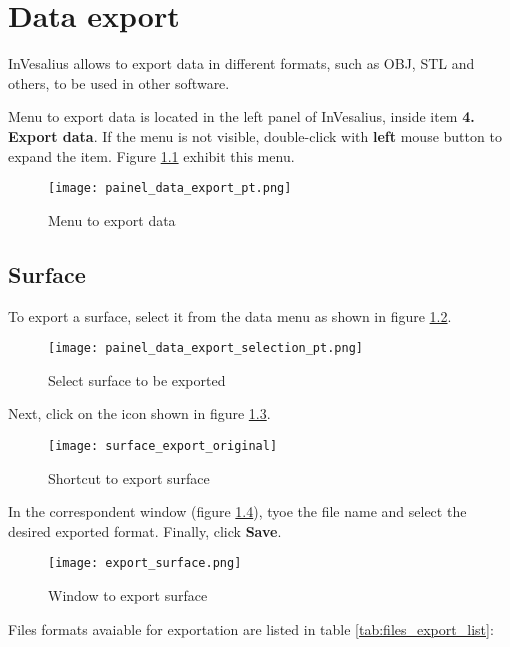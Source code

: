 \chapter{Data export}

InVesalius allows to export data in different formats, such as OBJ, STL and others, to be used in other software.

Menu to export data is located in the left panel of InVesalius,
inside item \textbf{4. Export data}. If the menu is not visible, double-click with \textbf{left} mouse button
to expand the item. Figure \ref{fig:data_export} exhibit this menu.

\begin{figure}[!htb]
\centering
\texttt{[image: painel\_data\_export\_pt.png]}
\caption{Menu to export data}
\label{fig:data_export}
\end{figure}

\section{Surface}

To export a surface, select it from the data menu as shown in
figure \ref{fig:data_export_selection}.

\newpage

\begin{figure}[!htb]
\centering
\texttt{[image: painel\_data\_export\_selection\_pt.png]}
\caption{Select surface to be exported}
\label{fig:data_export_selection}
\end{figure}

Next, click on the icon shown in figure \ref{fig:surface_export_original}.

\begin{figure}[!htb]
\centering
\texttt{[image: surface\_export\_original]}
\caption{Shortcut to export surface}
\label{fig:surface_export_original}
\end{figure}

In the correspondent window (figure \ref{fig:export_data_window}), tyoe the file name and
select the desired exported format. Finally, click \textbf{Save}.


\begin{figure}[!htb]
\centering
\texttt{[image: export\_surface.png]}
\caption{Window to export surface}
\label{fig:export_data_window}
\end{figure}

Files formats avaiable for exportation are listed in table
\ref{tab:files_export_list}:

